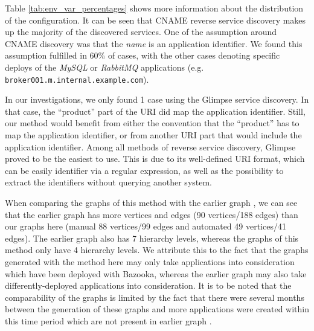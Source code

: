 Table \ref{tab:env_var_percentages} shows more information about the distribution of the configuration. It can be seen that CNAME reverse service discovery makes up the majority of the discovered services. One of the assumption around CNAME discovery was that the \emph{name} is an application identifier. We found this assumption fulfilled in 60\% of cases, with the other cases denoting specific deploys of the \emph{MySQL} or \emph{RabbitMQ} applications (e.g. \lstinline{broker001.m.internal.example.com}).

In our investigations, we only found 1 case using the Glimpse service discovery. In that case, the ``product'' part of the URI did map the application identifier. Still, our method would benefit from either the convention that the ``product'' has to map the application identifier, or from another URI part that would include the application identifier. Among all methods of reverse service discovery, Glimpse proved to be the easiest to use. This is due to its well-defined URI format, which can be easily identifier via a regular expression, as well as the possibility to extract the identifiers without querying another system.

When comparing the graphs of this method with the earlier graph , we can see that the earlier graph has more vertices and edges (90 vertices/188 edges) than our graphs here (manual 88 vertices/99 edges and automated 49 vertices/41 edges). The earlier graph also has 7 hierarchy levels, whereas the graphs of this method only have 4 hierarchy levels. We attribute this to the fact that the graphs generated with the method here may only take applications into consideration which have been deployed with Bazooka, whereas the earlier graph may also take differently-deployed applications into consideration. It is to be noted that the comparability of the graphs is limited by the fact that there were several months between the generation of these graphs and more applications were created within this time period which are not present in earlier graph .



